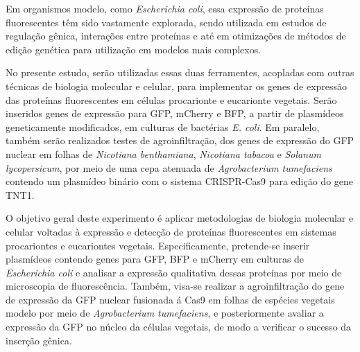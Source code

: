 Em organismos modelo, como \textit{Escherichia coli}, essa expressão de
proteínas fluorescentes têm sido vastamente explorada, sendo utilizada em
estudos de regulação gênica, interações entre proteínas e até em otimizações de
métodos de edição genética para utilização em modelos mais complexos. 

No presente estudo, serão utilizadas essas duas ferramentes, acopladas com
outras técnicas de biologia molecular e celular, para implementar os genes de
expressão das proteínas fluorescentes em células procarionte e eucarionte
vegetais. Serão inseridos genes de expressão para GFP, mCherry e BFP, a partir
de plasmídeos geneticamente modificados, em culturas de bactérias \textit{E.
coli}. Em paralelo, também serão realizados testes de agroinfiltração, dos genes
de expressão do GFP nuclear em folhas de \textit{Nicotiana benthamiana},
\textit{Nicotiana tabacoa} e \textit{Solanum lycopersicum}, por meio de uma cepa
atenuada de \textit{Agrobacterium tumefaciens} contendo um plasmídeo binário com
o sistema CRISPR-Cas9 para edição do gene TNT1.

O objetivo geral deste experimento é aplicar metodologias de biologia molecular
e celular voltadas à expressão e detecção de proteínas fluorescentes em sistemas
procariontes e eucariontes vegetais. Especificamente, pretende-se inserir
plasmídeos contendo genes para GFP, BFP e mCherry em culturas de
\textit{Escherichia coli}  e analisar a expressão qualitativa dessas proteínas
por meio de microscopia de fluorescência. Também, visa-se realizar a
agroinfiltração do gene de expressão da GFP nuclear fusionada á Cas9 em folhas
de espécies vegetais modelo por meio de \textit{Agrobacterium tumefaciens}, e
posteriormente avaliar a expressão da GFP no núcleo da células vegetais, de modo
a verificar o sucesso da inserção gênica. 
